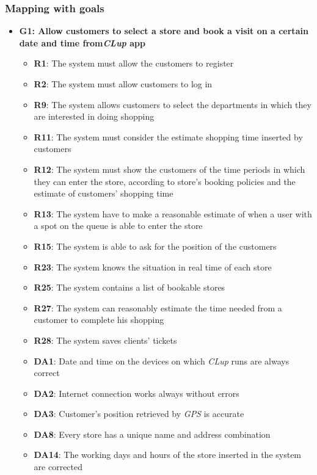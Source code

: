 \documentclass{article}
\begin{document}
		\subsubsection{Mapping with goals}
			
			\begin{itemize}			

				\item {\bfseries G1: Allow customers to select a store and book a visit on a certain date and time
				from\emph{CLup} app}			

					\begin{itemize}
						
						\item {\bfseries R1}: The system must allow the customers to register
						\item {\bfseries R2}: The system must allow customers to log in
						\item {\bfseries R9}: The system allows customers to select the departments in which they are interested in doing shopping						\item {\bfseries R11}: The system must consider the estimate shopping time inserted by customers
						\item {\bfseries R12}: The system must show the customers of the time periods in which they can enter the store, according to store's booking policies and the estimate of customers' shopping time
						\item {\bfseries R13}: The system have to make a reasonable estimate of when a user with a spot on the queue is able to enter the store
						\item {\bfseries R15}: The system is able to ask for the position of the customers
						\item {\bfseries R23}: The system knows the situation in real time of each store 
						\item {\bfseries R25}: The system contains a list of bookable stores
						\item {\bfseries R27}: The system can reasonably estimate the time needed from a customer to complete his shopping
						\item {\bfseries R28}: The system saves clients' tickets \\	
									
						\item {\bfseries DA1}: Date and time on the devices on which \emph{CLup} runs are always correct
						\item {\bfseries DA2}: Internet connection works always without errors
						\item {\bfseries DA3}: Customer’s position retrieved by \emph{GPS} is accurate
						\item {\bfseries DA8}: Every store has a unique name and address combination
						\item {\bfseries DA14}: The working days and hours of the store inserted in the system are corrected
					

\end{itemize}
\end{itemize}
\end{document}
